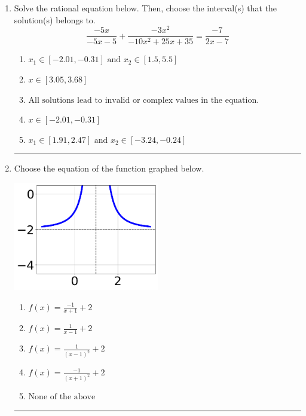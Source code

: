 \documentclass[14pt]{extbook}
\newcommand{\litem}[1]{\item#1\hspace*{-1cm}\rule{\textwidth}{0.4pt}}
\begin{document}
\begin{enumerate}
{\begin{enumerate}[label=\Alph*.]
\end{enumerate} }
\litem{
Solve the rational equation below. Then, choose the interval(s) that the solution(s) belongs to.\[ \frac{-5x}{-5x -5} + \frac{-3x^{2}}{-10x^{2} +25 x + 35} = \frac{-7}{2x -7} \]\begin{enumerate}[label=\Alph*.]
\item \( x_1 \in [-2.01, -0.31] \text{ and } x_2 \in [1.5,5.5] \)
\item \( x \in [3.05,3.68] \)
\item \( \text{All solutions lead to invalid or complex values in the equation.} \)
\item \( x \in [-2.01,-0.31] \)
\item \( x_1 \in [1.91, 2.47] \text{ and } x_2 \in [-3.24,-0.24] \)

\end{enumerate} }
\litem{
Choose the equation of the function graphed below.
\begin{center}
    \includegraphics[width=0.5\textwidth]{../Figures/rationalGraphToEquationC.png}
\end{center}
\begin{enumerate}[label=\Alph*.]
\item \( f(x) = \frac{-1}{x + 1} + 2 \)
\item \( f(x) = \frac{1}{x - 1} + 2 \)
\item \( f(x) = \frac{1}{(x - 1)^2} + 2 \)
\item \( f(x) = \frac{-1}{(x + 1)^2} + 2 \)
\item \( \text{None of the above} \)


\end{enumerate}}
\end{enumerate}
\end{document}
